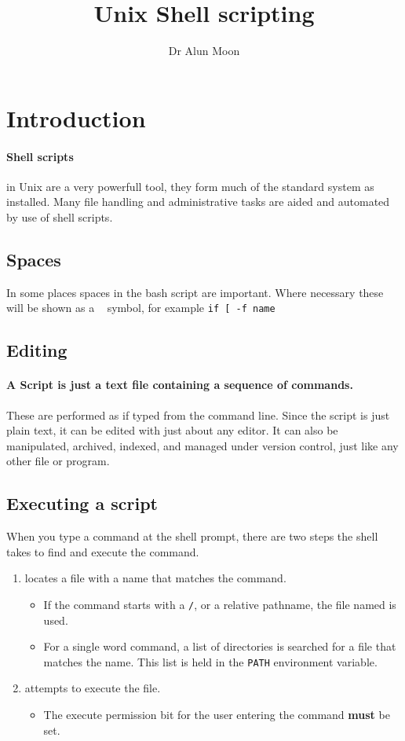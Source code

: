 \documentclass[a4paper]{article}
\title{Unix Shell scripting}
\author{Dr Alun Moon}
\begin{document}
\maketitle
\section{Introduction}
\paragraph{Shell scripts} in Unix are a very powerfull tool, they
form much of the standard system as installed.  Many file handling and
administrative tasks are aided and automated by use of shell scripts.

\subsection{Spaces}
In some places spaces in the bash script are important.  Where
necessary these will be shown as a \verb*| | symbol, for example
\verb*'if [ -f name'

\subsection{Editing}
\paragraph{A Script is just a text file containing a sequence of
  commands.}  These are performed as if typed from the command line.
Since the script is just plain text, it can be edited with just about any
editor.  It can also be manipulated, archived, indexed, and managed under
version control,  just like any other file or program.

\subsection{Executing a script}
When you type a command at the shell prompt, there are two steps the shell
takes to find and execute the command.
\begin{enumerate}
	\item locates a file with a name that matches the command.
		\begin{itemize}
			\item If the command starts with a \verb'/', or a relative
				pathname, the file named is used.
			\item For a single word command, a list of directories is searched
				for a file that matches the name.  This list is held in the
				\verb'PATH' environment variable.
		\end{itemize}
	\item attempts to execute the file.
		\begin{itemize}
			\item The execute permission bit for the user entering the command
				\textbf{must} be set.
		\end{itemize}
\end{enumerate}
\end{document}
